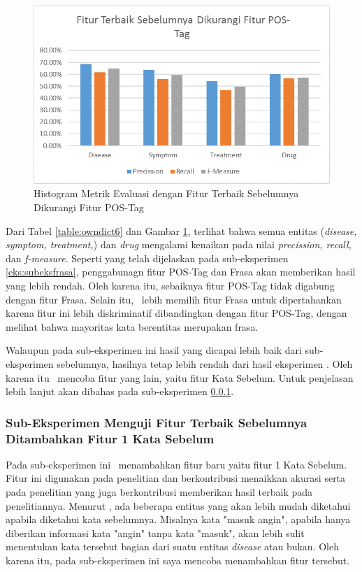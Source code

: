 	\begin{figure}
		\centering
		\includegraphics[width=\linewidth]{images/histogram6}
		\caption{Histogram Metrik Evaluasi dengan Fitur Terbaik Sebelumnya Dikurangi Fitur POS-Tag}
		\label{fig:owndict6}
	\end{figure}
	
	Dari Tabel \ref{table:owndict6} dan Gambar \ref{fig:owndict6}, terlihat bahwa semua entitas (\textit{disease, symptom, treatment,}) dan \textit{drug} mengalami kenaikan pada nilai \textit{precission, recall,} dan \textit{f-measure}. Seperti yang telah dijelaskan pada sub-eksperimen \ref{eks:subeksfrasa}, penggabunagn fitur POS-Tag dan Frasa akan memberikan hasil yang lebih rendah. Oleh karena itu, sebaiknya fitur POS-Tag tidak digabung dengan fitur Frasa. Selain itu, \saya~lebih memilih fitur Frasa untuk dipertahankan karena fitur ini lebih diskriminatif dibandingkan dengan fitur POS-Tag, dengan melihat bahwa mayoritas kata berentitas merupakan frasa.
	
	Walaupun pada sub-eksperimen ini hasil yang dicapai lebih baik dari sub-eksperimen sebelumnya, hasilnya tetap lebih rendah dari hasil eksperimen \cite{skripsiKakRadit}. Oleh karena itu \saya~mencoba fitur yang lain, yaitu fitur Kata Sebelum. Untuk penjelasan lebih lanjut akan dibahas pada sub-eksperimen \ref{eks:subekswbef1}.
	
	\subsubsection{Sub-Eksperimen Menguji Fitur Terbaik Sebelumnya Ditambahkan Fitur 1 Kata Sebelum}\label{eks:subekswbef1}
	Pada sub-eksperimen ini \saya~menambahkan fitur baru yaitu fitur 1 Kata Sebelum. Fitur ini digunakan pada penelitian \cite{abacha2011medical} dan berkontribusi menaikkan akurasi serta pada penelitian \cite{skripsiKakRadit} yang juga berkontribusi memberikan hasil terbaik pada penelitiannya. Menurut \saya, ada beberapa entitas yang akan lebih mudah diketahui apabila diketahui kata sebelumnya. Misalnya kata "masuk angin", apabila hanya diberikan informasi kata "angin" tanpa kata "masuk", akan lebih sulit menentukan kata tersebut bagian dari suatu entitas \textit{disease} atau bukan. Oleh karena itu, pada sub-eksperimen ini saya mencoba menambahkan fitur tersebut.
	
